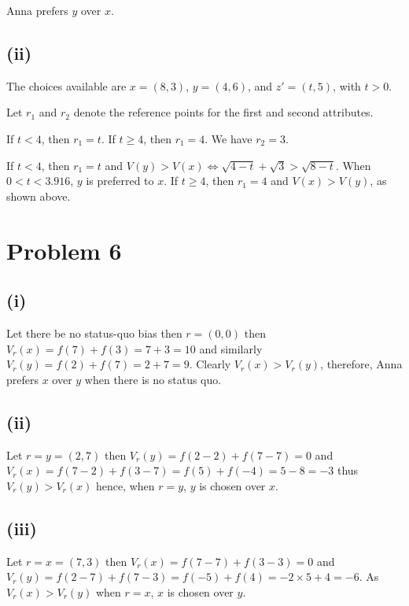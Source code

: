 \documentclass{article}
\begin{document}
Anna prefers $y$ over $x$.


\subsection*{(ii)} The choices available are $x = (8, 3)$, $y = (4, 6)$, and $z' = (t, 5)$, with $t > 0$.

Let $r_{1}$ and $r_{2}$ denote the reference points for the first and second attributes.

If $t < 4$, then $r_{1} = t$. If $t \geq 4$, then $r_{1} = 4$. We have $r_{2} = 3$.

If $t < 4$, then $r_{1} = t$ and $V(y) > V(x) \iff \sqrt{4 - t} + \sqrt{3} > \sqrt{8 - t}$. When $0 < t < 3.916$, $y$ is preferred to $x$. If $t \geq 4$, then $r_{1} = 4$ and $V(x) > V(y)$, as shown above.


\section*{Problem 6} %
\subsection*{(i)}
Let there be no status-quo bias then $r=(0,0)$ then $V_r(x)=f(7)+f(3)=7+3=10$ and similarly $V_r(y)=f(2)+f(7)=2+7=9$. Clearly $V_r(x)>V_r(y)$, therefore, Anna prefers $x$ over $y$ when there is no status quo.

\subsection*{(ii)}
Let $r=y=(2,7)$ then $V_r(y)=f(2-2)+f(7-7)=0$ and $V_r(x)=f(7-2)+f(3-7)=f(5)+f(-4)=5-8=-3$ thus $V_r(y)>V_r(x)$ hence, when $r=y$, $y$ is chosen over $x$.

\subsection*{(iii)}
Let $r=x=(7,3)$ then $V_r(x)=f(7-7)+f(3-3)=0$ and $V_r(y)=f(2-7)+f(7-3)=f(-5)+f(4)=-2\times5+4=-6$. As $V_r(x)>V_r(y)$ when $r=x$, $x$ is chosen over $y$.
\end{document}
